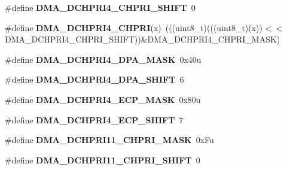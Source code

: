 \begin{DoxyCompactItemize}
\item 
\#define {\bfseries D\+M\+A\+\_\+\+D\+C\+H\+P\+R\+I4\+\_\+\+C\+H\+P\+R\+I\+\_\+\+S\+H\+I\+FT}~0\hypertarget{group__DMA__Register__Masks_gad164e5f8091a94ef38abd6570d97b761}{}\label{group__DMA__Register__Masks_gad164e5f8091a94ef38abd6570d97b761}

\item 
\#define {\bfseries D\+M\+A\+\_\+\+D\+C\+H\+P\+R\+I4\+\_\+\+C\+H\+P\+RI}(x)~(((uint8\+\_\+t)(((uint8\+\_\+t)(x))$<$$<$D\+M\+A\+\_\+\+D\+C\+H\+P\+R\+I4\+\_\+\+C\+H\+P\+R\+I\+\_\+\+S\+H\+I\+FT))\&D\+M\+A\+\_\+\+D\+C\+H\+P\+R\+I4\+\_\+\+C\+H\+P\+R\+I\+\_\+\+M\+A\+SK)\hypertarget{group__DMA__Register__Masks_gabd84d94a94b70b261a2a49660f0035e9}{}\label{group__DMA__Register__Masks_gabd84d94a94b70b261a2a49660f0035e9}

\item 
\#define {\bfseries D\+M\+A\+\_\+\+D\+C\+H\+P\+R\+I4\+\_\+\+D\+P\+A\+\_\+\+M\+A\+SK}~0x40u\hypertarget{group__DMA__Register__Masks_gaf4a7bab4a376e47cbcc44e02cff09748}{}\label{group__DMA__Register__Masks_gaf4a7bab4a376e47cbcc44e02cff09748}

\item 
\#define {\bfseries D\+M\+A\+\_\+\+D\+C\+H\+P\+R\+I4\+\_\+\+D\+P\+A\+\_\+\+S\+H\+I\+FT}~6\hypertarget{group__DMA__Register__Masks_ga62b07715af664512e04bc2b02ca12993}{}\label{group__DMA__Register__Masks_ga62b07715af664512e04bc2b02ca12993}

\item 
\#define {\bfseries D\+M\+A\+\_\+\+D\+C\+H\+P\+R\+I4\+\_\+\+E\+C\+P\+\_\+\+M\+A\+SK}~0x80u\hypertarget{group__DMA__Register__Masks_ga1d848e32bb5131ea22811b9165d83d44}{}\label{group__DMA__Register__Masks_ga1d848e32bb5131ea22811b9165d83d44}

\item 
\#define {\bfseries D\+M\+A\+\_\+\+D\+C\+H\+P\+R\+I4\+\_\+\+E\+C\+P\+\_\+\+S\+H\+I\+FT}~7\hypertarget{group__DMA__Register__Masks_gac5f10de0dfe7e5561053741e9e38e371}{}\label{group__DMA__Register__Masks_gac5f10de0dfe7e5561053741e9e38e371}

\item 
\#define {\bfseries D\+M\+A\+\_\+\+D\+C\+H\+P\+R\+I11\+\_\+\+C\+H\+P\+R\+I\+\_\+\+M\+A\+SK}~0x\+Fu\hypertarget{group__DMA__Register__Masks_ga4b7b6d2e60a016af53e079b20cad7b99}{}\label{group__DMA__Register__Masks_ga4b7b6d2e60a016af53e079b20cad7b99}

\item 
\#define {\bfseries D\+M\+A\+\_\+\+D\+C\+H\+P\+R\+I11\+\_\+\+C\+H\+P\+R\+I\+\_\+\+S\+H\+I\+FT}~0\hypertarget{group__DMA__Register__Masks_ga832f65fc63433161ecd5d5ffdfbd125d}{}\label{group__DMA__Register__Masks_ga832f65fc63433161ecd5d5ffdfbd125d}


\end{DoxyCompactItemize}
